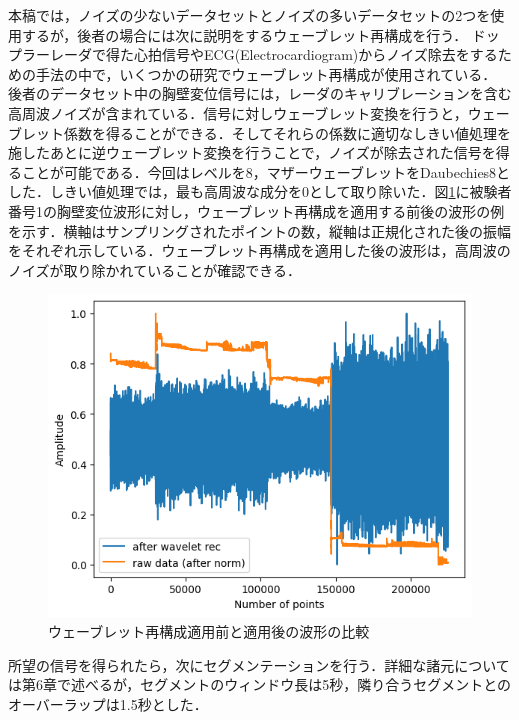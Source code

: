 本稿では，ノイズの少ないデータセットとノイズの多いデータセットの2つを使用するが，後者の場合には次に説明をするウェーブレット再構成を行う．
ドップラーレーダで得た心拍信号やECG(Electrocardiogram)からノイズ除去をするための手法の中で，いくつかの研究でウェーブレット再構成が使用されている\cite{paper:de-noise_technique, paper:dengue, paper:ecg_noise_removal}．
後者のデータセット中の胸壁変位信号には，レーダのキャリブレーションを含む高周波ノイズが含まれている．信号に対しウェーブレット変換を行うと，ウェーブレット係数を得ることができる．そしてそれらの係数に適切なしきい値処理を施したあとに逆ウェーブレット変換を行うことで，ノイズが除去された信号を得ることが可能である．今回はレベルを8，マザーウェーブレットをDaubechies8とした．しきい値処理では，最も高周波な成分を0として取り除いた．図\ref{fig:wave}に被験者番号1の胸壁変位波形に対し，ウェーブレット再構成を適用する前後の波形の例を示す．横軸はサンプリングされたポイントの数，縦軸は正規化された後の振幅をそれぞれ示している．ウェーブレット再構成を適用した後の波形は，高周波のノイズが取り除かれていることが確認できる．

\begin{figure}[H]
\begin{center}
\includegraphics[width=\linewidth]{./fig/comparison_raw_wavelet_ID01.png}
\end{center}
\caption{ウェーブレット再構成適用前と適用後の波形の比較}
\label{fig:wave}
\end{figure}

所望の信号を得られたら，次にセグメンテーションを行う．詳細な諸元については第6章で述べるが，セグメントのウィンドウ長は5秒，隣り合うセグメントとのオーバーラップは1.5秒とした．


